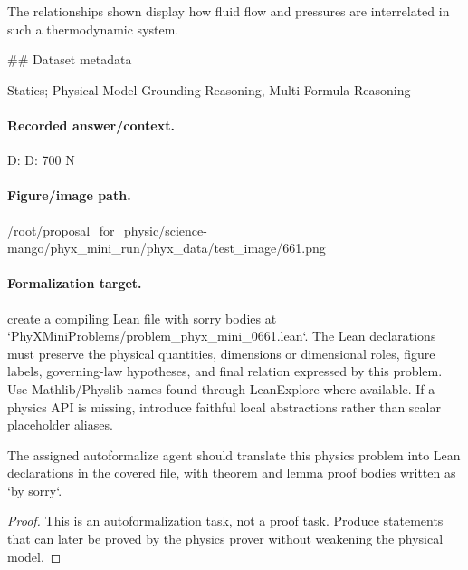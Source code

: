 The relationships shown display how fluid flow and pressures are interrelated in such a thermodynamic system.

\#\# Dataset metadata

Statics; Physical Model Grounding Reasoning, Multi-Formula Reasoning

\paragraph{Recorded answer/context.}
D: D: 700 N

\paragraph{Figure/image path.}
/root/proposal\_for\_physic/science-mango/phyx\_mini\_run/phyx\_data/test\_image/661.png

\paragraph{Formalization target.}
create a compiling Lean file with sorry bodies at `PhyXMiniProblems/problem\_phyx\_mini\_0661.lean`. The Lean declarations must preserve the physical quantities, dimensions or dimensional roles, figure labels, governing-law hypotheses, and final relation expressed by this problem.
Use Mathlib/Physlib names found through LeanExplore where available. If a physics API is missing, introduce faithful local abstractions rather than scalar placeholder aliases.

\begin{theorem}
\label{thm:physics:phyx_mini_0661:target}
The assigned autoformalize agent should translate this physics problem into Lean declarations in the covered file, with theorem and lemma proof bodies written as `by sorry`.
\end{theorem}
\begin{proof}
This is an autoformalization task, not a proof task. Produce statements that can later be proved by the physics prover without weakening the physical model.
\end{proof}

